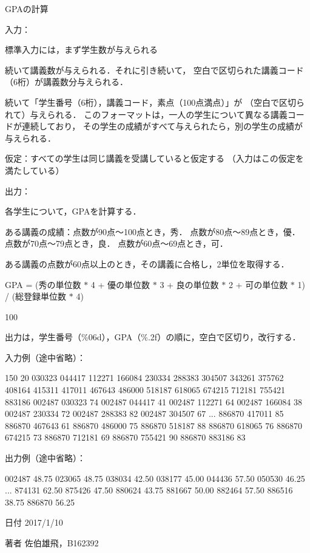 G\-P\-Aの計算 

入力：
\begin{DoxyItemize}
\item 標準入力には，まず学生数が与えられる
\item 続いて講義数が与えられる．それに引き続いて， 空白で区切られた講義コード（6桁）が講義数分与えられる．
\item 続いて「学生番号（6桁），講義コード，素点（100点満点）」が （空白で区切られて）与えられる． このフォーマットは，一人の学生について異なる講義コードが連続しており， その学生の成績がすべて与えられたら，別の学生の成績が与えられる．
\item 仮定：すべての学生は同じ講義を受講していると仮定する （入力はこの仮定を満たしている）
\end{DoxyItemize}

出力：
\begin{DoxyItemize}
\item 各学生について，\-G\-P\-Aを計算する．
\item ある講義の成績：点数が90点〜100点とき，秀． 点数が80点〜89点とき，優． 点数が70点〜79点とき，良． 点数が60点〜69点とき，可．
\item ある講義の点数が60点以上のとき，その講義に合格し，2単位を取得する．
\item G\-P\-A = (秀の単位数 $\ast$ 4 + 優の単位数 $\ast$ 3 + 良の単位数 $\ast$ 2 + 可の単位数 $\ast$ 1) / (総登録単位数 $\ast$ 4)
\begin{DoxyItemize}
\item 100
\end{DoxyItemize}
\item 出力は，学生番号（\%06d），\-G\-P\-A（\%.2f）の順に，空白で区切り，改行する．
\end{DoxyItemize}

入力例（途中省略）： \begin{DoxyVerb}150
20
030323 044417 112271 166084 230334 288383 304507 343261 375762 408164 415311
417011 467643 486000 518187 618065 674215 712181 755421 883186
002487 030323 74
002487 044417 41
002487 112271 64
002487 166084 38
002487 230334 72
002487 288383 82
002487 304507 67
...
886870 417011 85
886870 467643 61
886870 486000 75
886870 518187 88
886870 618065 76
886870 674215 73
886870 712181 69
886870 755421 90
886870 883186 83
\end{DoxyVerb}
 出力例（途中省略）： \begin{DoxyVerb}002487 48.75
023065 48.75
038034 42.50
038177 45.00
044436 57.50
050530 46.25
...
874131 62.50
875426 47.50
880624 43.75
881667 50.00
882464 57.50
886516 38.75
886870 56.25
\end{DoxyVerb}
 \begin{DoxyDate}{日付}
2017/1/10 
\end{DoxyDate}
\begin{DoxyAuthor}{著者}
佐伯雄飛，\-B162392 
\end{DoxyAuthor}


